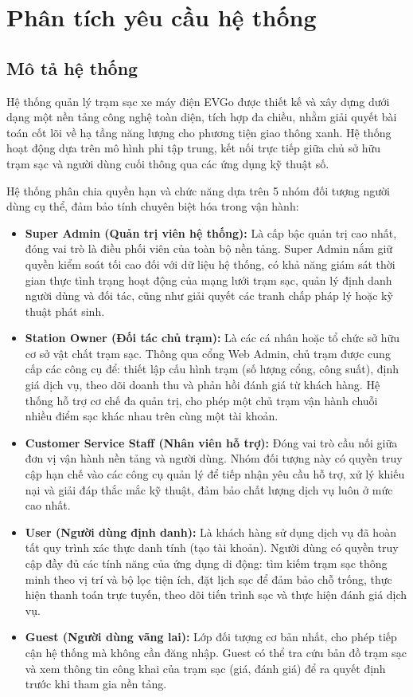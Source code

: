 \section{Phân tích yêu cầu hệ thống}
\subsection{Mô tả hệ thống}
Hệ thống quản lý trạm sạc xe máy điện EVGo được thiết kế và xây dựng dưới dạng một nền tảng công nghệ toàn diện, tích hợp đa chiều, nhằm giải quyết bài toán cốt lõi về hạ tầng năng lượng cho phương tiện giao thông xanh. Hệ thống hoạt động dựa trên mô hình phi tập trung, kết nối trực tiếp giữa chủ sở hữu trạm sạc và người dùng cuối thông qua các ứng dụng kỹ thuật số.

Hệ thống phân chia quyền hạn và chức năng dựa trên 5 nhóm đối tượng người dùng cụ thể, đảm bảo tính chuyên biệt hóa trong vận hành:

\begin{itemize}
    \item \textbf{Super Admin (Quản trị viên hệ thống):}
    Là cấp bậc quản trị cao nhất, đóng vai trò là điều phối viên của toàn bộ nền tảng. Super Admin nắm giữ quyền kiểm soát tối cao đối với dữ liệu hệ thống, có khả năng giám sát thời gian thực tình trạng hoạt động của mạng lưới trạm sạc, quản lý định danh người dùng và đối tác, cũng như giải quyết các tranh chấp pháp lý hoặc kỹ thuật phát sinh.

    \item \textbf{Station Owner (Đối tác chủ trạm):}
    Là các cá nhân hoặc tổ chức sở hữu cơ sở vật chất trạm sạc. Thông qua cổng Web Admin, chủ trạm được cung cấp các công cụ để: thiết lập cấu hình trạm (số lượng cổng, công suất), định giá dịch vụ, theo dõi doanh thu và phản hồi đánh giá từ khách hàng. Hệ thống hỗ trợ cơ chế đa quản trị, cho phép một chủ trạm vận hành chuỗi nhiều điểm sạc khác nhau trên cùng một tài khoản.

    \item \textbf{Customer Service Staff (Nhân viên hỗ trợ):}
    Đóng vai trò cầu nối giữa đơn vị vận hành nền tảng và người dùng. Nhóm đối tượng này có quyền truy cập hạn chế vào các công cụ quản lý để tiếp nhận yêu cầu hỗ trợ, xử lý khiếu nại và giải đáp thắc mắc kỹ thuật, đảm bảo chất lượng dịch vụ luôn ở mức cao nhất.

    \item \textbf{User (Người dùng định danh):}
    Là khách hàng sử dụng dịch vụ đã hoàn tất quy trình xác thực danh tính (tạo tài khoản). Người dùng có quyền truy cập đầy đủ các tính năng của ứng dụng di động: tìm kiếm trạm sạc thông minh theo vị trí và bộ lọc tiện ích, đặt lịch sạc để đảm bảo chỗ trống, thực hiện thanh toán trực tuyến, theo dõi tiến trình sạc và thực hiện đánh giá dịch vụ.

    \item \textbf{Guest (Người dùng vãng lai):}
    Lớp đối tượng cơ bản nhất, cho phép tiếp cận hệ thống mà không cần đăng nhập. Guest có thể tra cứu bản đồ trạm sạc và xem thông tin công khai của trạm sạc (giá, đánh giá) để ra quyết định trước khi tham gia nền tảng.
\end{itemize}

